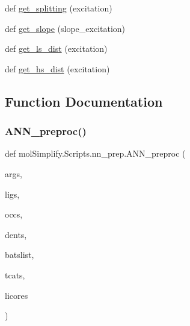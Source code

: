 \begin{DoxyCompactItemize}
\item 
def \hyperlink{namespacemolSimplify_1_1Scripts_1_1nn__prep_a2b38f865c0c7c80b7a52a3c192f63710}{get\+\_\+splitting} (excitation)
\item 
def \hyperlink{namespacemolSimplify_1_1Scripts_1_1nn__prep_afe00de86d6396534ef290e9af41cba21}{get\+\_\+slope} (slope\+\_\+excitation)
\item 
def \hyperlink{namespacemolSimplify_1_1Scripts_1_1nn__prep_a3520d79ef4fef68e6c0c81b6d9826539}{get\+\_\+ls\+\_\+dist} (excitation)
\item 
def \hyperlink{namespacemolSimplify_1_1Scripts_1_1nn__prep_a9330ceba13f8770d16dca07343342ed0}{get\+\_\+hs\+\_\+dist} (excitation)
\end{DoxyCompactItemize}


\subsection{Function Documentation}
\mbox{\label{namespacemolSimplify_1_1Scripts_1_1nn__prep_a1dc3c3db41886be863ad7596a4894653}} 
\subsubsection{\texorpdfstring{A\+N\+N\+\_\+preproc()}{ANN\_preproc()}}
{\footnotesize\ttfamily def mol\+Simplify.\+Scripts.\+nn\+\_\+prep.\+A\+N\+N\+\_\+preproc (\begin{DoxyParamCaption}\item[{}]{args,  }\item[{}]{ligs,  }\item[{}]{occs,  }\item[{}]{dents,  }\item[{}]{batslist,  }\item[{}]{tcats,  }\item[{}]{licores }\end{DoxyParamCaption})}

\mbox{\label{namespacemolSimplify_1_1Scripts_1_1nn__prep_ae8c4328eb9dd534e5c4375e3c53df085}} 

